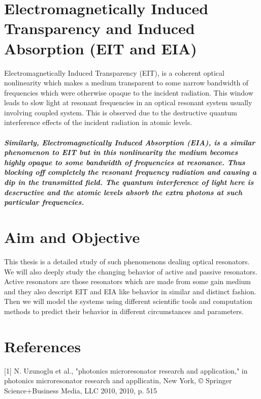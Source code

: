 \newpage

\section{Electromagnetically Induced Transparency and Induced Absorption (EIT and EIA)}
Electromagnetically Induced Transparency (EIT), is a coherent optical nonlinearity which makes a medium transparent to some narrow bandwidth of frequencies which were otherwise opaque to the incident radiation. This window leads to slow light at resonant frequencies in an optical resonant system usually involving coupled system. This is observed due to the destructive quantum interference effects of the incident radiation in atomic levels.

\subparagraph{\normalfont \large Similarly, Electromagnetically Induced Absorption (EIA), is a similar phenomenon to EIT but in this nonlinearity the medium becomes highly opaque to some bandwidth of frequencies at resonance. Thus blocking off completely the resonant frequency radiation and causing a dip in the transmitted field. The quantum interference of light here is descructive and the atomic levels absorb the extra photons at such particular frequencies. }

\newpage
\section{Aim and Objective}
This thesis is a detailed study of such phenomenons dealing optical resonators. We will also deeply study the changing behavior of active and passive resonators. Active resonators are those resonators which are made from some gain medium and they also descript EIT and EIA like behavior in similar and distinct fashion. Then we will model the systems using different scientific tools and computation methods to predict their behavior in different circumstances and parameters. 


\newpage
\section*{References}

[1] N. Uzunoglu et al., "photonics microresonator research and application," in photonics
microresonator research and appllicatin, New York, © Springer Science+Business Media,
LLC 2010, 2010, p. 515
